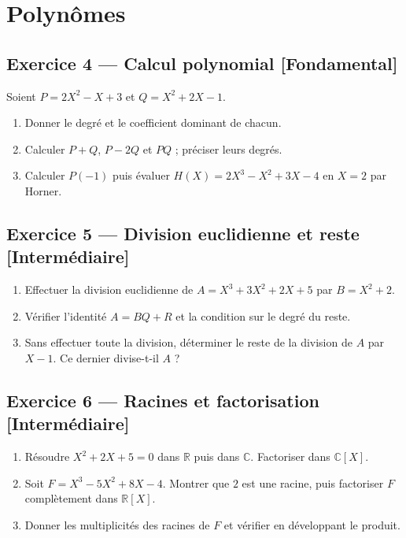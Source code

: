 \documentclass[11pt,a4paper,oneside]{article}
\newcommand{\exo}[3]{%
  \Needspace{6\baselineskip}%
  \subsection*{Exercice #1 --- #3 \hfill
  {\normalfont\footnotesize\color{GrisTexte}[#2]}}}
\newcommand{\R}{\mathbb{R}}
\newcommand{\C}{\mathbb C}
\begin{document}
\section{Polynômes}
\exo{4}{Fondamental}{Calcul polynomial}
Soient $P=2X^2-X+3$ et $Q=X^2+2X-1$.
\begin{enumerate}[label=\alph*)]
\item Donner le degré et le coefficient dominant de chacun.
\item Calculer $P+Q$, $P-2Q$ et $PQ$ ; préciser leurs degrés.
\item Calculer $P(-1)$ puis évaluer $H(X)=2X^3-X^2+3X-4$ en $X=2$ par Horner.
\end{enumerate}
\exo{5}{Intermédiaire}{Division euclidienne et reste}
\begin{enumerate}[label=\alph*)]
\item Effectuer la division euclidienne de $A=X^3+3X^2+2X+5$ par $B=X^2+2$.
\item Vérifier l'identité $A=BQ+R$ et la condition sur le degré du reste.
\item Sans effectuer toute la division, déterminer le reste de la division de $A$ par $X-1$. Ce dernier divise-t-il $A$ ?
\end{enumerate}
\exo{6}{Intermédiaire}{Racines et factorisation}
\begin{enumerate}[label=\alph*)]
\item Résoudre $X^2+2X+5=0$ dans $\R$ puis dans $\C$. Factoriser dans $\C[X]$.
\item Soit $F=X^3-5X^2+8X-4$. Montrer que $2$ est une racine, puis factoriser $F$ complètement dans $\R[X]$.
\item Donner les multiplicités des racines de $F$ et vérifier en développant le produit.
\end{enumerate}
\end{document}
